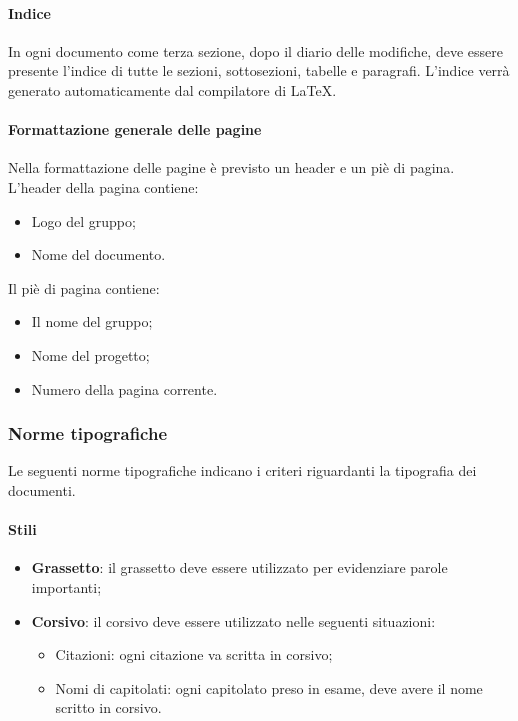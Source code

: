 \documentclass[../NormeDiProgetto.tex]{subfiles}
\begin{document}
\paragraph{Indice}
In ogni documento come terza sezione, dopo il diario delle modifiche, deve essere presente l'indice di tutte le sezioni, sottosezioni, tabelle e paragrafi.
L'indice verrà generato automaticamente dal compilatore di \LaTeX .

\paragraph{Formattazione generale delle pagine}
Nella formattazione delle pagine è previsto un header e un piè di pagina.
L'header della pagina contiene:
\begin{itemize}
	\item Logo del gruppo;
 	\item Nome del documento.
\end{itemize}
Il piè di pagina contiene:
\begin{itemize}
  \item Il nome del gruppo;
  \item Nome del progetto;
  \item Numero della pagina corrente.
\end{itemize}

\subsubsection{Norme tipografiche}
Le seguenti norme tipografiche indicano i criteri riguardanti la tipografia dei documenti.

\paragraph{Stili}
\begin{itemize}
  \item \textbf{Grassetto}: il grassetto deve essere utilizzato per evidenziare parole importanti;
  \item \textbf{Corsivo}: il corsivo deve essere utilizzato nelle seguenti
  situazioni:
  \begin{itemize}
    \item Citazioni: ogni citazione va scritta in corsivo;
    \item Nomi di capitolati: ogni capitolato preso in esame, deve avere il nome scritto in corsivo.
  \end{itemize}
\end{itemize}
\end{document}
